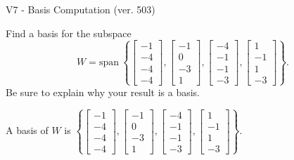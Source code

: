\begin{exercise}
  \begin{exerciseTitle}V7 - Basis Computation (ver. 503)\end{exerciseTitle}
  \begin{exerciseStatement}
    Find a basis for the subspace 
\[W=\mathrm{span}\ \left\{\left[\begin{array}{r}
-1 \\
-4 \\
-4 \\
-4
\end{array}\right] , \left[\begin{array}{r}
-1 \\
0 \\
-3 \\
1
\end{array}\right] , \left[\begin{array}{r}
-4 \\
-1 \\
-1 \\
-3
\end{array}\right] , \left[\begin{array}{r}
1 \\
-1 \\
1 \\
-3
\end{array}\right]\right\}.\]
 Be sure to explain why your result is a basis.


  \end{exerciseStatement}
  \begin{exerciseAnswer}
   A basis of \(W\) is  \(\left\{\left[\begin{array}{r}
-1 \\
-4 \\
-4 \\
-4
\end{array}\right] , \left[\begin{array}{r}
-1 \\
0 \\
-3 \\
1
\end{array}\right] , \left[\begin{array}{r}
-4 \\
-1 \\
-1 \\
-3
\end{array}\right] , \left[\begin{array}{r}
1 \\
-1 \\
1 \\
-3
\end{array}\right]\right\}\).
  


  \end{exerciseAnswer}
\end{exercise}